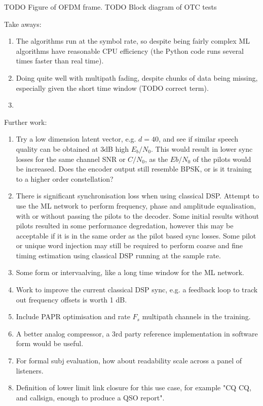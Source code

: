 \documentclass{article}
\begin{document}
TODO Figure of OFDM frame.  TODO Block diagram of OTC tests

Take aways:
\begin{enumerate}
\item The algorithms run at the symbol rate, so despite being fairly complex ML algorithms have reasonable CPU efficiency (the Python code runs several times faster than real time).
\item Doing quite well with multipath fading, despite chunks of data being missing, especially given the short time window (TODO correct term).
\item
\end{enumerate}

Further work:
\begin{enumerate}
\item Try a low dimension latent vector, e.g. $d=40$, and see if similar speech quality can be obtained at 3dB high $E_b/N_0$. This would result in lower sync losses for the same channel SNR or $C/N_0$, as the $Eb/N_0$ of the pilots would be increased. Does the encoder output still resemble BPSK, or is it training to a higher order constellation?
\item There is significant synchronisation loss when using classical DSP. Attempt to use the ML network to perform frequency, phase and amplitude equalisation, with or without passing the pilots to the decoder.  Some initial results without pilots resulted in some performance degredation, however this may be acceptable if it is in the same order as the pilot based sync losses. Some pilot or unique word injection may still be required to perform coarse and fine timing estimation using classical DSP running at the sample rate.
\item Some form or intervaalving, like a long time window for the ML network.
\item Work to improve the current classical DSP sync, e.g. a feedback loop to track out frequency offsets is worth 1 dB.
\item Include PAPR optimisation and rate $F_s$ multipath channels in the training.
\item A better analog compressor, a 3rd party reference implementation in software form would be useful.
\item For formal subj evaluation, how about readability scale across a panel of listeners.
\item Definition of lower limit link closure for this use case, for example "CQ CQ, and callsign, enough to produce a QSO report".

\end{enumerate}
\end{document}

